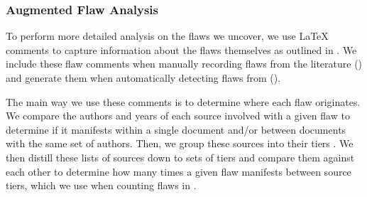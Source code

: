 \subsubsection{Augmented Flaw Analysis}\label{aug-flaw-analysis}

To perform more detailed analysis on the flaws we uncover, we use \LaTeX{}
comments to capture information about the flaws themselves as outlined in
. We include these flaw comments when manually recording
flaws from the literature () and generate them when
automatically detecting flaws from \ourApproachGlossary{}
().

The main way we use these comments is to determine where each flaw originates.
We compare the authors and years of each source involved with a given flaw
to determine if it manifests within a single document and/or between documents
with the same set of authors. Then, we group these sources into their tiers
.
We then distill these lists of sources down to sets of tiers and compare them
against each other to determine how many times a given flaw manifests between
source tiers, which we use when counting flaws in .


